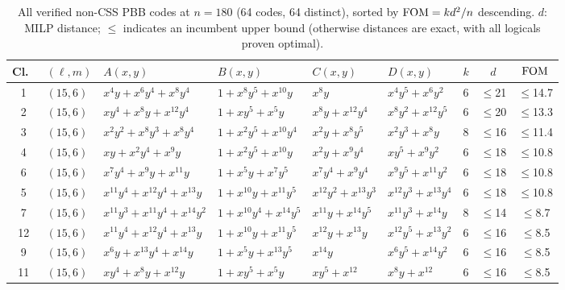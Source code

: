 \begin{table}[t]
\centering
\caption{All verified non-CSS PBB codes at $n = 180$ (64 codes, 64 distinct), sorted by $\mathrm{FOM} = kd^2/n$ descending.
$d$: MILP distance; $\leq$ indicates an incumbent upper bound (otherwise distances are exact, with all logicals proven optimal).}
\label{tab:pbb_cat180}
\tiny
\renewcommand{\arraystretch}{0.82}
\setlength{\tabcolsep}{1.5pt}
\begin{tabular*}{\textwidth}{@{\extracolsep{\fill}}cllllllcc}
\toprule
Cl.\ & $(\ell,m)$ & $A(x,y)$ & $B(x,y)$ & $C(x,y)$ & $D(x,y)$ & $k$ & $d$ & $\mathrm{FOM}$ \\
\midrule
1 & $(15,6)$ & $x^{4}y{+}x^{6}y^{4}{+}x^{8}y^{4}$ & $1{+}x^{8}y^{5}{+}x^{10}y$ & $x^{8}y$ & $x^{4}y^{5}{+}x^{6}y^{2}$ & 6 & $\leq$21 & $\leq$14.7 \\
2 & $(15,6)$ & $xy^{4}{+}x^{8}y{+}x^{12}y^{4}$ & $1{+}xy^{5}{+}x^{5}y$ & $x^{8}y{+}x^{12}y^{4}$ & $x^{8}y^{2}{+}x^{12}y^{5}$ & 6 & $\leq$20 & $\leq$13.3 \\
3 & $(15,6)$ & $x^{2}y^{2}{+}x^{8}y^{3}{+}x^{8}y^{4}$ & $1{+}x^{2}y^{5}{+}x^{10}y^{4}$ & $x^{2}y{+}x^{8}y^{5}$ & $x^{2}y^{3}{+}x^{8}y$ & 8 & $\leq$16 & $\leq$11.4 \\
4 & $(15,6)$ & $xy{+}x^{2}y^{4}{+}x^{9}y$ & $1{+}x^{2}y^{5}{+}x^{10}y$ & $x^{2}y{+}x^{9}y^{4}$ & $xy^{5}{+}x^{9}y^{2}$ & 6 & $\leq$18 & $\leq$10.8 \\
6 & $(15,6)$ & $x^{7}y^{4}{+}x^{9}y{+}x^{11}y$ & $1{+}x^{5}y{+}x^{7}y^{5}$ & $x^{7}y^{4}{+}x^{9}y^{4}$ & $x^{9}y^{5}{+}x^{11}y^{2}$ & 6 & $\leq$18 & $\leq$10.8 \\
5 & $(15,6)$ & $x^{11}y^{4}{+}x^{12}y^{4}{+}x^{13}y$ & $1{+}x^{10}y{+}x^{11}y^{5}$ & $x^{12}y^{2}{+}x^{13}y^{3}$ & $x^{12}y^{3}{+}x^{13}y^{4}$ & 6 & $\leq$18 & $\leq$10.8 \\
7 & $(15,6)$ & $x^{11}y^{3}{+}x^{11}y^{4}{+}x^{14}y^{2}$ & $1{+}x^{10}y^{4}{+}x^{14}y^{5}$ & $x^{11}y{+}x^{14}y^{5}$ & $x^{11}y^{3}{+}x^{14}y$ & 8 & $\leq$14 & $\leq$8.7 \\
12 & $(15,6)$ & $x^{11}y^{4}{+}x^{12}y^{4}{+}x^{13}y$ & $1{+}x^{10}y{+}x^{11}y^{5}$ & $x^{12}y{+}x^{13}y$ & $x^{12}y^{5}{+}x^{13}y^{2}$ & 6 & $\leq$16 & $\leq$8.5 \\
9 & $(15,6)$ & $x^{6}y{+}x^{13}y^{4}{+}x^{14}y$ & $1{+}x^{5}y{+}x^{13}y^{5}$ & $x^{14}y$ & $x^{6}y^{5}{+}x^{14}y^{2}$ & 6 & $\leq$16 & $\leq$8.5 \\
11 & $(15,6)$ & $xy^{4}{+}x^{8}y{+}x^{12}y$ & $1{+}xy^{5}{+}x^{5}y$ & $xy^{5}{+}x^{12}$ & $x^{8}y{+}x^{12}$ & 6 & $\leq$16 & $\leq$8.5 \\

\end{tabular*}
\end{table}
